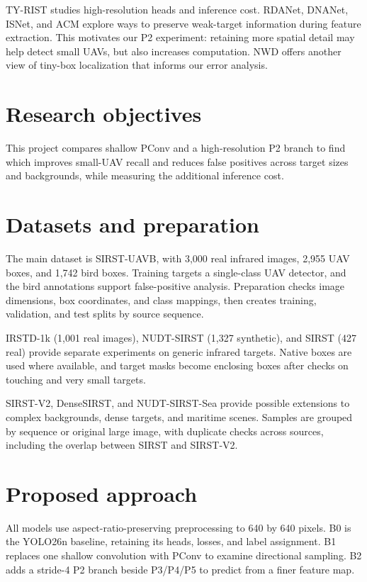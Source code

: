 \documentclass[lettersize,journal]{IEEEtran}
\begin{document}
TY-RIST studies high-resolution heads and inference cost\cite{atrash2025tyrist}. RDANet, DNANet, ISNet, and ACM explore ways to preserve weak-target information during feature extraction\cite{liu2026rdanet,li2023dnanet,zhang2022isnet,dai2021acm}. This motivates our P2 experiment: retaining more spatial detail may help detect small UAVs, but also increases computation. NWD offers another view of tiny-box localization\cite{wang2021nwd} that informs our error analysis.

\section{Research objectives}
This project compares shallow PConv and a high-resolution P2 branch to find which improves small-UAV recall and reduces false positives across target sizes and backgrounds, while measuring the additional inference cost.

\section{Datasets and preparation}
The main dataset is SIRST-UAVB, with 3,000 real infrared images, 2,955 UAV boxes, and 1,742 bird boxes\cite{yang2025pconv}. Training targets a single-class UAV detector, and the bird annotations support false-positive analysis. Preparation checks image dimensions, box coordinates, and class mappings, then creates training, validation, and test splits by source sequence.

IRSTD-1k (1,001 real images), NUDT-SIRST (1,327 synthetic), and SIRST (427 real) provide separate experiments on generic infrared targets\cite{zhang2022isnet,li2023dnanet,dai2021acm}. Native boxes are used where available, and target masks become enclosing boxes after checks on touching and very small targets.

SIRST-V2, DenseSIRST, and NUDT-SIRST-Sea provide possible extensions to complex backgrounds, dense targets, and maritime scenes\cite{dai2023oscar,xiao2025bafe,wu2023mtunet}. Samples are grouped by sequence or original large image, with duplicate checks across sources, including the overlap between SIRST and SIRST-V2.

\section{Proposed approach}
All models use aspect-ratio-preserving preprocessing to 640 by 640 pixels. B0 is the YOLO26n baseline, retaining its heads, losses, and label assignment\cite{jocher2026yolo26,ultralytics2026docs}. B1 replaces one shallow convolution with PConv\cite{yang2025pconv} to examine directional sampling. B2 adds a stride-4 P2 branch beside P3/P4/P5 to predict from a finer feature map.
\end{document}
